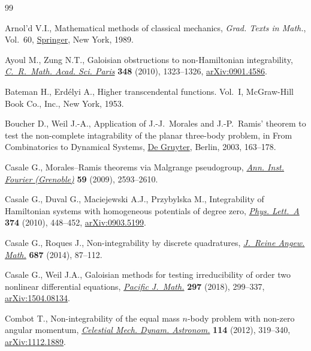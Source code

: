 \begin{thebibliography}{99}
\footnotesize\itemsep=0pt

Arnol'd V.I., Mathematical methods of classical mechanics, \textit{Grad. Texts
 in Math.}, Vol.~60, \href{https://doi.org/10.1007/978-1-4757-2063-1}{Springer}, New York, 1989.

Ayoul M., Zung N.T., Galoisian obstructions to non-{H}amiltonian integrability,
 \href{https://doi.org/10.1016/j.crma.2010.10.024}{\textit{C.~R.~Math. Acad. Sci. Paris}} \textbf{348} (2010), 1323--1326,
 \href{https://arxiv.org/abs/0901.4586}{arXiv:0901.4586}.

Bateman H., Erd\'elyi A., Higher transcendental functions. {V}ol.~{I},
 McGraw-Hill Book Co., Inc., New York, 1953.

Boucher D., Weil J.-A., Application of J.-J.~Morales and J.-P.~Ramis' theorem to
 test the non-complete intagrability of the planar three-body problem, in From
 Combinatorics to Dynamical Systems, \href{https://doi.org/10.1515/9783110200003.163}{De Gruyter}, Berlin, 2003, 163--178.

Casale G., {M}orales--{R}amis theorems via {M}algrange pseudogroup,
 \href{https://doi.org/10.5802/aif.2501}{\textit{Ann. Inst. Fourier (Grenoble)}} \textbf{59} (2009), 2593--2610.

Casale G., Duval G., Maciejewski A.J., Przybylska M., Integrability of
 {H}amiltonian systems with homogeneous potentials of degree zero,
 \href{https://doi.org/10.1016/j.physleta.2009.11.018}{\textit{Phys. Lett.~A}} \textbf{374} (2010), 448--452, \href{https://arxiv.org/abs/0903.5199}{arXiv:0903.5199}.

Casale G., Roques J., Non-integrability by discrete quadratures,
 \href{https://doi.org/10.1515/crelle-2012-0054}{\textit{J.~Reine Angew. Math.}} \textbf{687} (2014), 87--112.

Casale G., Weil J.A., Galoisian methods for testing irreducibility of order two
 nonlinear differential equations, \href{https://doi.org/10.2140/pjm.2018.297.299}{\textit{Pacific J.~Math.}} \textbf{297}
 (2018), 299--337, \href{https://arxiv.org/abs/1504.08134}{arXiv:1504.08134}.

Combot T., Non-integrability of the equal mass {$n$}-body problem with non-zero
 angular momentum, \href{https://doi.org/10.1007/s10569-012-9417-z}{\textit{Celestial Mech. Dynam. Astronom.}} \textbf{114}
 (2012), 319--340, \href{https://arxiv.org/abs/1112.1889}{arXiv:1112.1889}.


\end{thebibliography}
